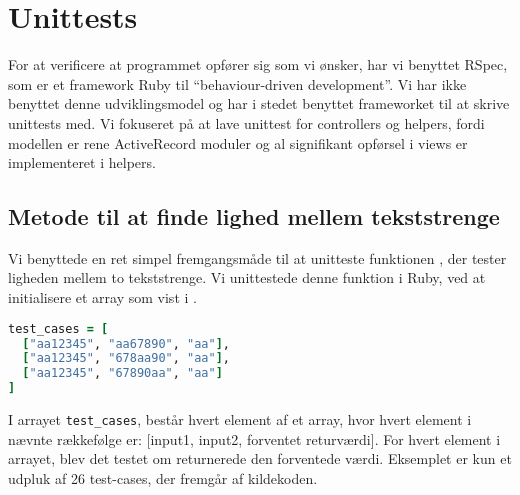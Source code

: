 \section{Unittests}
\label{sec:unittests}
For at verificere at programmet opfører sig som vi ønsker, har vi benyttet RSpec, som er et framework Ruby til ``behaviour-driven development''. Vi har ikke benyttet denne udviklingsmodel og har i stedet benyttet frameworket til at skrive unittests med.
Vi fokuseret på at lave unittest for controllers og helpers, fordi modellen er rene ActiveRecord moduler og al signifikant opførsel i views er implementeret i helpers.

\subsection{Metode til at finde lighed mellem tekststrenge}
Vi benyttede en ret simpel fremgangsmåde til at unitteste funktionen , der tester ligheden mellem to tekststrenge. Vi unittestede denne funktion i Ruby, ved at initialisere et array som vist i .

\begin{lstlisting}[caption={Et eksempel på en række testcases til brug ved unittesting.},label=lst:testcases,language=Ruby]
test_cases = [
  ["aa12345", "aa67890", "aa"],
  ["aa12345", "678aa90", "aa"],
  ["aa12345", "67890aa", "aa"]
]
\end{lstlisting}

I arrayet \texttt{test\_cases}, består hvert element af et array, hvor hvert element i nævnte rækkefølge er: [input1, input2, forventet returværdi].
For hvert element i arrayet, blev det testet om  returnerede den forventede værdi. Eksemplet er kun et udpluk af 26 test-cases, der fremgår af kildekoden.
